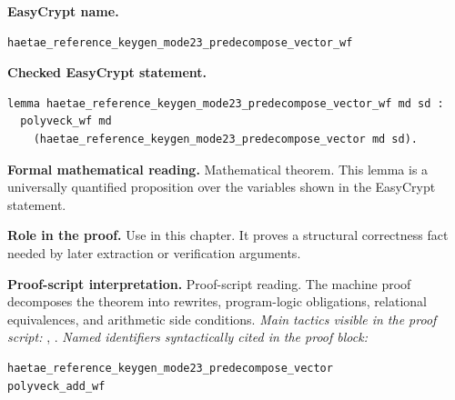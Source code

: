 \begin{formaltheorem}
\noindent\textbf{EasyCrypt name.}
\begin{lstlisting}[language=EasyCrypt,basicstyle=\ttfamily\scriptsize]
haetae_reference_keygen_mode23_predecompose_vector_wf
\end{lstlisting}
\noindent\textbf{Checked EasyCrypt statement.}
\begin{lstlisting}[language=EasyCrypt,basicstyle=\ttfamily\scriptsize]
lemma haetae_reference_keygen_mode23_predecompose_vector_wf md sd :
  polyveck_wf md
    (haetae_reference_keygen_mode23_predecompose_vector md sd).
\end{lstlisting}
\noindent\textbf{Formal mathematical reading.}
Mathematical theorem. This lemma is a universally quantified proposition over the variables shown in the EasyCrypt statement.

\noindent\textbf{Role in the proof.}
Use in this chapter. It proves a structural correctness fact needed by later extraction or verification arguments.

\noindent\textbf{Proof-script interpretation.}
Proof-script reading. The machine proof decomposes the theorem into rewrites, program-logic obligations, relational equivalences, and arithmetic side conditions.
\emph{Main tactics visible in the proof script:} , .
\emph{Named identifiers syntactically cited in the proof block:}
\begin{lstlisting}[language=EasyCrypt,basicstyle=\ttfamily\scriptsize]
haetae_reference_keygen_mode23_predecompose_vector
polyveck_add_wf
\end{lstlisting}

\end{formaltheorem}

